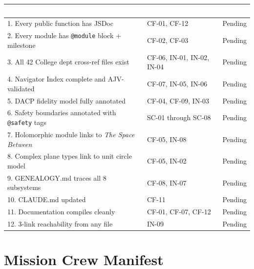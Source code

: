 \documentclass[11pt,letterpaper]{article}
\newcommand{\tableheader}[1]{\textbf{\sffamily\textcolor{white}{#1}}}
\begin{document}
\begin{center}
\begin{tabularx}{\textwidth}{XL{3.5cm}C{1.5cm}}
\toprule
{}
\tableheader{Success Criterion} & \tableheader{Test ID(s)} & \tableheader{Status} \\
. Every public function has JSDoc & CF-01, CF-12 & Pending \\
2. Every module has \texttt{@module} block + milestone & CF-02, CF-03 & Pending \\
3. All 42 College dept cross-ref files exist & CF-06, IN-01, IN-02, IN-04 & Pending \\
4. Navigator Index complete and AJV-validated & CF-07, IN-05, IN-06 & Pending \\
5. DACP fidelity model fully annotated & CF-04, CF-09, IN-03 & Pending \\
6. Safety boundaries annotated with \texttt{@safety} tags & SC-01 through SC-08 & Pending \\
7. Holomorphic module links to \textit{The Space Between} & CF-05, IN-08 & Pending \\
8. Complex plane types link to unit circle model & CF-05, IN-02 & Pending \\
9. GENEALOGY.md traces all 8 subsystems & CF-08, IN-07 & Pending \\
10. CLAUDE.md updated & CF-11 & Pending \\
11. Documentation compiles cleanly & CF-01, CF-07, CF-12 & Pending \\
12. 3-link reachability from any file & IN-09 & Pending \\
\bottomrule
\end{tabularx}
\end{center}

\section{Mission Crew Manifest}
\end{document}
